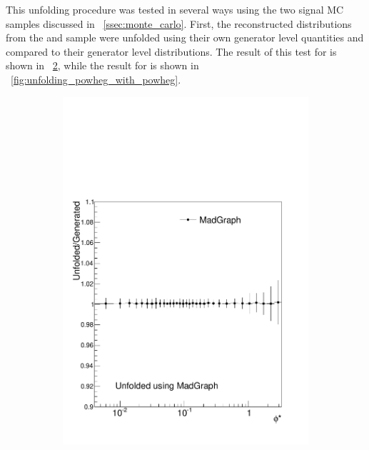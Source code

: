 This unfolding procedure was tested in several ways using the two signal MC
samples discussed in \SEC~\ref{ssec:monte_carlo}. First, the reconstructed
\phistar distributions from the \MADGRAPH and \POWHEG sample were unfolded
using their own generator level quantities and compared to their generator
level \phistar distributions.
The result of this test for \MADGRAPH is shown
in \FIG~\ref{fig:unfolding_madgraph_with_madgraph}, while the result for
\POWHEG is shown in \FIG~\ref{fig:unfolding_powheg_with_powheg}.

\begin{figure}[!htbp]
    \centering
    \begin{subfigure}[b]{\SideBySidePlotWidth}
        \includegraphics[width=\textwidth]{figures/BinM_MM.pdf}
        \caption{}
        \label{fig:unfolding_madgraph_with_madgraph}
    \end{subfigure}%

\end{figure}
